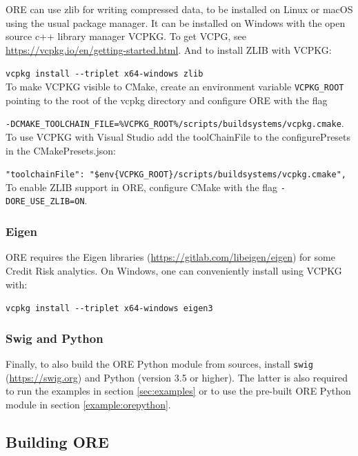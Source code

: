 ORE can use zlib for writing compressed data, to be installed on Linux or macOS using the usual package manager.
It can be installed on Windows with the open source c++ library manager VCPKG.
To get VCPG, see \url{https://vcpkg.io/en/getting-started.html}. And to install ZLIB with VCPKG:

\medskip
{\tt vcpkg install -{}-triplet x64-windows zlib} \\

\medskip
To make VCPKG visible to CMake, create an environment variable {\tt VCPKG\_ROOT} pointing to the root of the vcpkg directory
and configure ORE with the flag

\medskip
{\tt -DCMAKE\_TOOLCHAIN\_FILE=\%VCPKG\_ROOT\%/scripts/buildsystems/vcpkg.cmake}. \\

\medskip
To use VCPKG with Visual Studio add the toolChainFile to the configurePresets in the CMakePresets.json:

\medskip
{\tt "toolchainFile": "\$env\{VCPKG\_ROOT\}/scripts/buildsystems/vcpkg.cmake",}\\

\medskip
To enable ZLIB support in ORE, configure CMake with the flag {\tt -DORE\_USE\_ZLIB=ON}.

\subsubsection*{Eigen}

ORE requires the Eigen libraries (\url{https://gitlab.com/libeigen/eigen}) for some Credit Risk analytics.
On Windows, one can conveniently install using VCPKG with:

\medskip
{\tt vcpkg install -{}-triplet x64-windows eigen3}

\subsubsection*{Swig and Python}

Finally, to also build the ORE Python module from sources, install {\tt swig} (\url{https://swig.org}) and
Python (version 3.5 or higher). The latter is also required to run the examples in section \ref{sec:examples}
or to use the pre-built ORE Python module in section \ref{example:orepython}.

\subsection{Building ORE}\label{sec:build}

